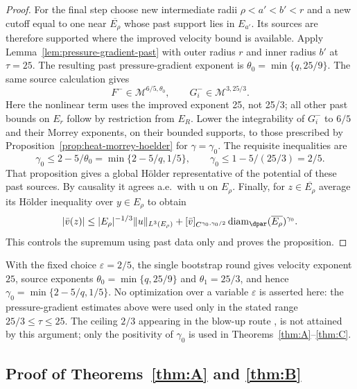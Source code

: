 \documentclass[11pt,reqno]{amsart}
\begin{document}
\begin{proof}
For the final step choose new intermediate radii
$\rho<a'<b'<r$ and a new cutoff equal to one near $\overline{E_\rho}$
whose past support lies in $E_{a'}$. Its sources are therefore supported
where the improved velocity bound is available. Apply
Lemma~\ref{lem:pressure-gradient-past} with outer radius $r$ and
inner radius $b'$ at $\tau=25$. The resulting past pressure-gradient
exponent is $\theta_0=\min\{q,25/9\}$. The same source calculation gives
\[
 F^-\in\mathcal M^{6/5,\theta_0},\qquad
 G_i^-\in\mathcal M^{3,25/3}.
\]
Here the nonlinear term uses the improved exponent 25, not 25/3;
all other past bounds on $E_r$ follow by restriction from $E_R$.
Lower the integrability of $G_i^-$ to $6/5$ and their Morrey exponents,
on their bounded supports, to those prescribed by
Proposition~\ref{prop:heat-morrey-hoelder} for $\gamma=\gamma_0$.
The requisite inequalities are
\[
 \gamma_0\le2-5/\theta_0=\min\{2-5/q,1/5\},\qquad
 \gamma_0\le1-5/(25/3)=2/5.
\]
That proposition gives a global H\"older representative of the
potential of these past sources. By causality it agrees a.e.\ with u
on $E_\rho$. Finally, for $z\in\overline{E_\rho}$ average its
H\"older inequality over $y\in E_\rho$ to obtain
\[
 |\bar v(z)|\le |E_\rho|^{-1/3}\|u\|_{L^3(E_\rho)}
       +[\bar v]_{C^{\gamma_0,\gamma_0/2}}
            \operatorname{diam}_{\dpar}(\overline{E_\rho})^{\gamma_0}.
\]
This controls the supremum using past data only and proves the proposition.
\end{proof}

\begin{remark}\label{rem:exponent}
With the fixed choice $\varepsilon=2/5$, the single bootstrap round gives
velocity exponent $25$, source exponents
$\theta_0=\min\{q,25/9\}$ and $\theta_1=25/3$, and hence
$\gamma_0=\min\{2-5/q,1/5\}$. No optimization over a variable
$\varepsilon$ is asserted here: the pressure-gradient estimates above
were used only in the stated range $25/3\le\tau\le25$.
The ceiling $2/3$ appearing in the blow-up route
\cite[Lemma 2.4]{LadyzhenskayaSeregin1999},
\cite[Remark 6.6]{Tsai2018} is not attained by this argument; only the
positivity of $\gamma_0$ is used in Theorems~\ref{thm:A}--\ref{thm:C}.
\end{remark}

\subsection{Proof of Theorems~\ref{thm:A} and \ref{thm:B}}\label{ss:assembly}
\end{document}
